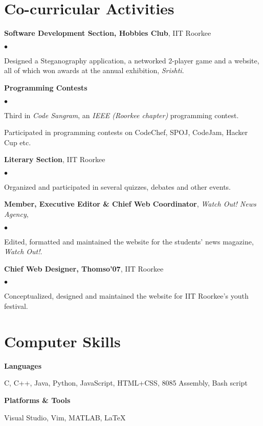 \documentclass[margin,line]{res}
\newenvironment{list1}{
  \begin{list}{\ding{113}}{%
      \setlength{\itemsep}{0in}
      \setlength{\parsep}{0in} \setlength{\parskip}{0in}
      \setlength{\topsep}{0in} \setlength{\partopsep}{0in} 
      \setlength{\leftmargin}{0.17in}}}{\end{list}}
\newenvironment{list2}{
  \begin{list}{$\bullet$}{%
      \setlength{\itemsep}{0in}
      \setlength{\parsep}{0in} \setlength{\parskip}{0in}
      \setlength{\topsep}{0in} \setlength{\partopsep}{0in} 
      \setlength{\leftmargin}{0.2in}}}{\end{list}}
\begin{document}
\begin{resume}
\section{\sc Co-curricular Activities} 
{\bf Software Development Section, Hobbies Club}, IIT Roorkee
\begin{list2}
\item Designed a Steganography application, a networked 2-player game and a website, all of which won awards at the annual exhibition, {\em Srishti}.
\end{list2}
{\bf Programming Contests}
\begin{list2}
\item Third in {\em Code Sangram}, an {\em IEEE (Roorkee chapter)} programming contest.
\item Participated in programming contests on CodeChef, SPOJ, CodeJam, Hacker Cup etc.
\end{list2}
{\bf Literary Section}, IIT Roorkee
\begin{list2}
\item Organized and participated in several quizzes, debates and other events.
\end{list2}
{\bf Member, Executive Editor \& Chief Web Coordinator}, {\em Watch Out! News Agency},
\begin{list2}
\item Edited, formatted  and maintained the website for the students' news magazine, {\em Watch Out!}.
\end{list2}
{\bf Chief Web Designer, Thomso'07}, IIT Roorkee
\begin{list2}
\item Conceptualized, designed and maintained the website for IIT Roorkee's youth festival.
\end{list2}

\section{\sc Computer Skills} 
{\bf Languages}
\begin{list1}
\item[]  C, C++, Java, Python, JavaScript, HTML+CSS, 8085 Assembly, Bash script
\end{list1}
{\bf Platforms \& Tools}
\begin{list1}
\item[] Visual Studio, Vim, MATLAB, \LaTeX{}
\end{list1}

\end{resume}
\end{document}
